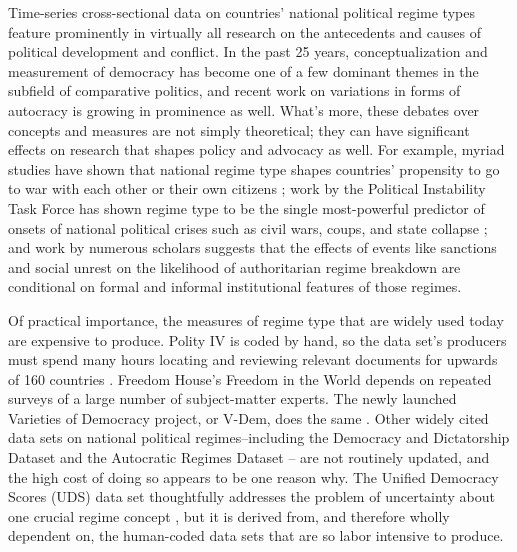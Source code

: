 \documentclass[pdftex,12pt,fullpage,oneside]{amsart}
\begin{document}
Time-series cross-sectional data on countries' national political regime types feature prominently in virtually all research on the antecedents and causes of political development and conflict. In the past 25 years, conceptualization and measurement of democracy has become one of a few dominant themes in the subfield of comparative politics, and recent work on variations in forms of autocracy is growing in prominence as well. What's more, these debates over concepts and measures are not simply theoretical; they can have significant effects on research that shapes policy and advocacy as well. For example, myriad studies have shown that national regime type shapes countries' propensity to go to war with each other or their own citizens \citep{hegre:2014}; work by the Political Instability Task Force has shown regime type to be the single most-powerful predictor of onsets of national political crises such as civil wars, coups, and state collapse \citep{goldstone2010global}; and work by numerous scholars suggests that the effects of events like sanctions \citep{geddes:2002,escriba-foch:wright:2010} and social unrest \citep{ulfelder:2005} on the likelihood of authoritarian regime breakdown are conditional on formal and informal institutional features of those regimes.

Of practical importance, the measures of regime type that are widely used today are expensive to produce. Polity IV is coded by hand, so the data set's producers must spend many hours locating and reviewing relevant documents for upwards of 160 countries \citep{marshall:jaggers:2002}. Freedom House's Freedom in the World depends on repeated surveys of a large number of subject-matter experts. The newly launched Varieties of Democracy project, or V-Dem, does the same \citep{coppedge:etal:2013}. Other widely cited data sets on national political regimes--including the Democracy and Dictatorship Dataset \citep{cheibub:etal:2010} and the Autocratic Regimes Dataset \citep{geddes:etal:2014} -- are not routinely updated, and the high cost of doing so appears to be one reason why. The Unified Democracy Scores (UDS) data set thoughtfully addresses the problem of uncertainty about one crucial regime concept \citep{pemstein:etal:2010}, but it is derived from, and therefore wholly dependent on, the human-coded data sets that are so labor intensive to produce.
\end{document}
